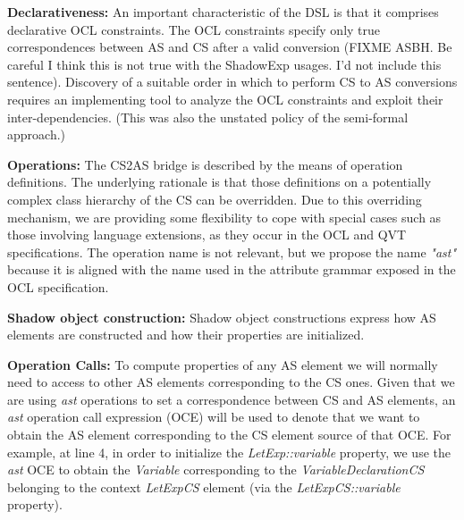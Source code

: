 \documentclass{llncs}
\begin{document}

\textbf{Declarativeness:} An important characteristic of the DSL is that it comprises declarative OCL constraints. The OCL constraints specify only true correspondences between AS and CS after a valid conversion (FIXME ASBH. Be careful I think this is not true with the ShadowExp usages. I'd not include this sentence). Discovery of a suitable order in which to perform CS to AS conversions requires an implementing tool to analyze the OCL constraints and exploit their inter-dependencies. (This was also the unstated policy of the semi-formal approach.)

\textbf{Operations:} The CS2AS bridge is described by the means of operation definitions. The underlying rationale is that those definitions on a potentially complex class hierarchy of the CS can be overridden. Due to this overriding mechanism, we are providing some flexibility to cope with special cases such as those involving language extensions, as they occur in the OCL and QVT specifications. The operation name is not relevant, but we propose the name \emph{"ast"} because it is aligned with the name used in the attribute grammar exposed in the OCL specification.

\textbf{Shadow object construction:} Shadow object constructions express how AS elements are constructed and how their properties are initialized. %

\textbf{Operation Calls:} To compute properties of any AS element we will normally need to access to other AS elements corresponding to the CS ones. Given that we are using \emph{ast} operations to set a correspondence between CS and AS elements, an \emph{ast} operation call expression (OCE) will be used to denote that we want to obtain the AS element corresponding to the CS element source of that OCE. For example, at line 4, in order to initialize the \emph{LetExp::variable} property, we use the \emph{ast} OCE to obtain the \emph{Variable} corresponding to the \emph{VariableDeclarationCS} belonging to the context \emph{LetExpCS} element (via the \emph{LetExpCS::variable} property).
\end{document}
